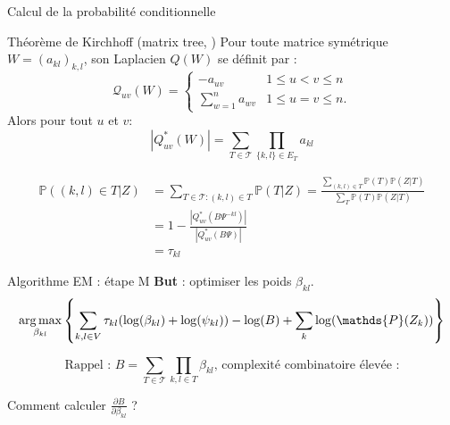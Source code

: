 \documentclass[11pt]{bredelebeamer}
\DeclareMathOperator*{\argmax}{arg\,max}
\begin{document}
\begin{frame}{Calcul de la probabilité conditionnelle}
\begin{exampleblock}{Théorème de Kirchhoff (matrix tree, \cite{kirchhoff})}
Pour toute matrice symétrique $W=(a_{kl})_{k,l}$, son Laplacien $Q(W)$ se définit par :
 \[\mathcal{Q}_{uv}(W)=
 \begin{cases}
     -a_{uv} & 1\leq u<v \leq n\\
    \sum_{w=1}^n a_{wv} & 1\leq u=v \leq n.
\end{cases}
\]
Alors pour tout $u$ et $v$:
    \[ |Q^*_{uv}(W)|=\sum_{T\in\mathcal{T}} \prod_{\{k,l\}\in E_T} a_{kl} \]
\end{exampleblock}
\begin{align*}
  \mathds{P}((k,l)\in T | Z)&=\sum_{T\in \mathcal{T} : (k,l)\in T}\mathds{P}( T | Z) = \frac{\sum_{(k,l)\in T} \mathds{P}(T)\mathds{P}(Z|T)}{\sum_{T} \mathds{P}(T)\mathds{P}(Z|T)}\\
 &=1- \frac{|Q^*_{uv}(B\Psi^{-kl})|}{|Q^*_{uv}(B\Psi)|}\\
 &= \tau_{kl}
 \end{align*}
 
\end{frame}





\begin{frame}{Algorithme EM : étape M}
\textbf{But} : optimiser les poids $\beta_{kl}$.\\
\vspace{1cm}
\[\argmax_{\beta_{kl}} \left\{\sum_{k,l\in V} \tau_{kl}(\emph{$\log(\beta_{kl})$} + \log(\psi_{kl}) ) -\emph{$\log(B)$} +\sum_k \log(\mathds{P}(Z_k))\right\}\]

  \vspace{1cm}
  
 \[\text{Rappel : } B = \sum_{T\in\mathcal{T}} \prod_{k,l\in T} \beta_{kl}\text{, complexité combinatoire élevée :} \]
 
 \begin{center}
     Comment calculer \Large{$\frac{\partial B}{\partial\beta_{kl}}$ }?
 \end{center}
\end{frame}
 
\end{document}
